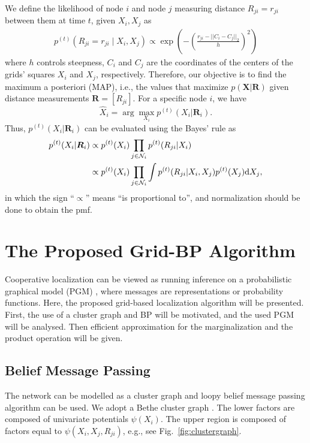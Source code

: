 \documentclass[10pt, final, journal]{IEEEtran}
\begin{document}
We define the likelihood of node $i$ and node $j$ measuring distance $R_{ji}=r_{ji}$ between them at time $t$, given $X_i,X_j$ as
\begin{align}
p^{(t)}(R_{ji}=r_{ji}\mid X_i, X_j) \propto \exp\left(-\left(\frac{r_{ji}- ||C_i-C_j ||_2}{h}\right)^2\right)
\end{align}
where $h$ controls steepness, $C_i$ and $C_j$ are the coordinates of the centers of the grids' squares $X_i$ and $X_j$, respectively. Therefore, our objective is to find the maximum a posteriori (MAP), i.e., the values that maximize $p(\bm{X}|\bm{R})$ given distance measurements $\bm{R}=[R_{ji}]$. For a specific node $i$, we have
\begin{equation}
\hat{{X}}_{i} = \arg\max_{{X}_{i}}p^{(t)}({X}_i|\bm{R}_{i}).
\end{equation}
Thus, $p^{(t)}({X}_i|\bm{R}_i)$ can be evaluated using the Bayes' rule as
\begin{align}
p^{(t)}({X}_i|\bm{R}_{i})&\propto p^{(t)}({X}_{i}) \prod_{j \in {\cal N}_i} p^{(t)}(R_{ji}|{X}_{i})\notag\\
&\propto p^{(t)}({X}_{i}) \prod_{j \in {\cal N}_i}\int p^{(t)}(R_{ji}|{X}_i,{X}_j) p^{(t)}({X}_{j})\text{d}{X}_j,\label{eq:product_marginal}
\end{align}
in which the sign ``$\propto$'' means ``is proportional to'', and normalization should be done to obtain the pmf.

\section{The Proposed Grid-BP Algorithm}\label{mgrs-bpalgorithm}
Cooperative localization can be viewed as running inference on a probabilistic graphical model (PGM) \cite{Wymeersch:2009hv}, where messages are representations or probability functions. Here, the proposed grid-based localization algorithm will be presented. First, the use of a cluster graph and BP will be motivated, and the used PGM will be analysed. Then efficient approximation for the marginalization and the product operation will be given.

\vspace{-.1in}
\subsection{Belief Message Passing}\label{beliefmessagepassing}
The network can be modelled as a cluster graph and loopy belief message passing algorithm can be used. We adopt a Bethe cluster graph \cite{Koller:2009tn}. The lower factors are composed of univariate potentials $\psi(X_{i})$. The upper region is composed of factors equal to $\psi( X_{i},X_{j}, R_{ji})$, e.g., see Fig.~\ref{fig:clustergraph}.
\end{document}
